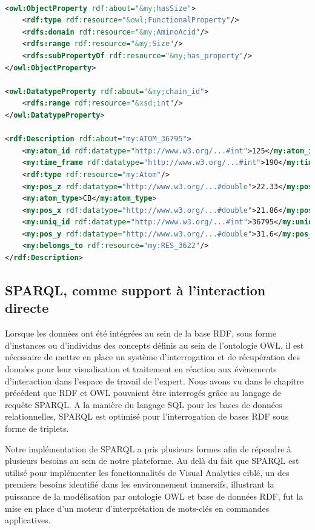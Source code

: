 \begin{lstlisting}[language=XML, caption=Exemple de triplets RDF présents dans notre base de données, label=rdf_xml]

<owl:ObjectProperty rdf:about="&my;hasSize">
    <rdf:type rdf:resource="&owl;FunctionalProperty"/>
    <rdfs:domain rdf:resource="&my;AminoAcid"/>
    <rdfs:range rdf:resource="&my;Size"/>
    <rdfs:subPropertyOf rdf:resource="&my;has_property"/>
</owl:ObjectProperty>

<owl:DatatypeProperty rdf:about="&my;chain_id">
    <rdfs:range rdf:resource="&xsd;int"/>
</owl:DatatypeProperty>

<rdf:Description rdf:about="my:ATOM_36795">
	<my:atom_id rdf:datatype="http://www.w3.org/...#int">125</my:atom_id>
	<my:time_frame rdf:datatype="http://www.w3.org/...#int">190</my:time_frame>
	<rdf:type rdf:resource="my:Atom"/>
	<my:pos_z rdf:datatype="http://www.w3.org/...#double">22.33</my:pos_z>
	<my:atom_type>CB</my:atom_type>
	<my:pos_x rdf:datatype="http://www.w3.org/...#double">21.86</my:pos_x>
	<my:uniq_id rdf:datatype="http://www.w3.org/...#int">36795</my:uniq_id>
	<my:pos_y rdf:datatype="http://www.w3.org/...#double">31.6</my:pos_y>
	<my:belongs_to rdf:resource="my:RES_3622"/>
</rdf:Description>

\end{lstlisting}

\subsection{SPARQL, comme support à l'interaction directe} \label{sparql_interpretation_engine}

Lorsque les données ont été intégrées au sein de la base RDF, sous forme d'instances ou d'individus des concepts définis au sein de l'ontologie OWL, il est nécessaire de mettre en place un système d'interrogation et de récupération des données pour leur visualisation et traitement en réaction aux évènements d'interaction dans l'espace de travail de l'expert. Nous avons vu dans le chapitre précédent que RDF et OWL pouvaient être interrogés grâce au langage de requête SPARQL. A la manière du langage SQL pour les bases de données relationnelles, SPARQL est optimisé pour l'interrogation de bases RDF sous forme de triplets.

Notre implémentation de SPARQL a pris plusieurs formes afin de répondre à plusieurs besoins au sein de notre plateforme. Au delà du fait que SPARQL est utilisé pour implémenter les fonctionnalités de Visual Analytics ciblé, un des premiers besoins identifié dans les environnement immersifs, illustrant la puissance de la modélisation par ontologie OWL et base de données RDF, fut la mise en place d'un moteur d'interprétation de mots-clés en commandes applicatives.

